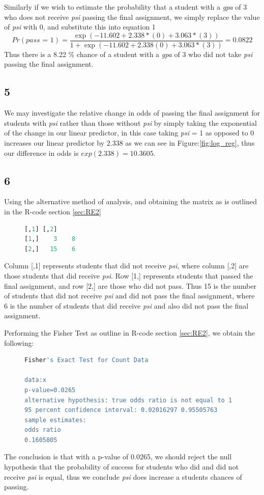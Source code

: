 \documentclass{article}
\begin{document}
    Similarly if we wish to estimate the probability that a student with a \textit{gpa} of 3 who does not receive \textit{psi} passing the final assignment, we simply replace the value of \textit{psi} with 0, and substitute this into equation 1
    \[
    Pr(\textit{pass = 1}) = \frac{\exp(-11.602 + 2.338*(0) + 3.063*(3))}{1 + \exp(-11.602 + 2.338(0) + 3.063*(3))} = 0.0822
    \]
    Thus there is a 8.22 \% chance of a student with a \textit{gpa} of 3 who did not take \textit{psi} passing the final assignment.
    \subsection*{5}
    We may investigate the relative change in odds of passing the final assignment for students with \textit{psi} rather than those without \textit{psi} by simply taking the exponential of the change in our linear predictor, in this case taking \textit{psi} = 1 as opposed to 0 increases our linear predictor by 2.338 as we can see in Figure:\ref{fig:log_reg}, thus our difference in odds is $exp(2.338) = 10.3605$.
    
    \subsection*{6}
    Using the alternative method of analysis, and obtaining the matrix as is outlined in the R-code section \ref{sec:RE2}
        	\begin{figure}[H]
    	\begin{lstlisting}[language=R]
     [,1] [,2]
[1,]    3    8
[2,]   15    6
    	\end{lstlisting}
    \end{figure}
    Column [,1] represents students that did not receive \textit{psi}, where column [,2] are those students that did receive \textit{psi}. Row [1,] represents students that passed the final assignment, and row [2,] are those who did not pass. Thus 15 is the number of students that did not receive \textit{psi} and did not pass the final assignment, where 6 is the number of students that did receive \textit{psi} and also did not pass the final assignment.
    
    Performing the Fisher Test as outline in R-code section \ref{sec:RE2}, we obtain the following:
            	\begin{figure}[H]
    	\begin{lstlisting}[language=R]
	Fisher's Exact Test for Count Data

data:x
p-value=0.0265
alternative hypothesis: true odds ratio is not equal to 1
95 percent confidence interval: 0.02016297 0.95505763
sample estimates:
odds ratio 
0.1605805 
    	\end{lstlisting}
    \end{figure}
    The conclusion is that with a p-value of 0.0265, we should reject the null hypothesis that the probability of success for students who did and did not receive \textit{psi} is equal, thus we conclude \textit{psi} does increase a students chances of passing.
\end{document}
